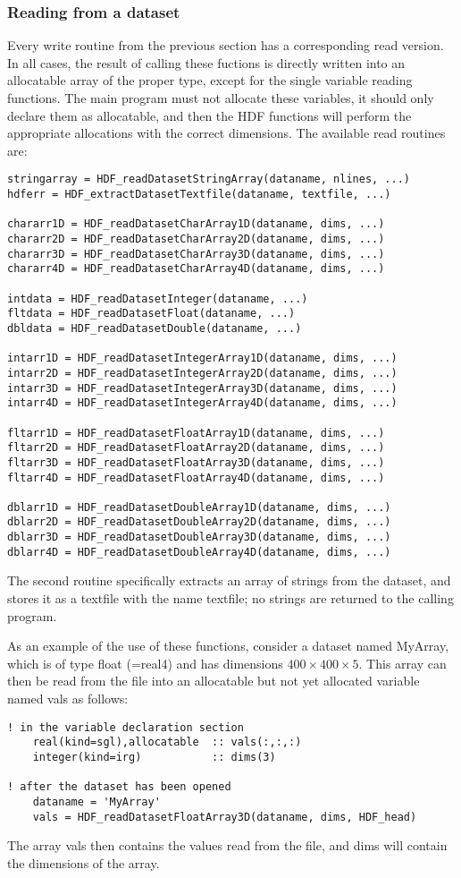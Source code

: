 \documentclass[DIV=calc, paper=letter, fontsize=11pt]{scrartcl}	 %
\begin{document}
\subsubsection{Reading from a dataset}
Every write routine from the previous section has a corresponding read version.  In 
all cases, the result of calling these fuctions is directly written into an allocatable 
array of the proper type, except for the single variable reading functions.  
The main program must not allocate these variables, it should
only declare them as allocatable, and then the HDF functions will perform the appropriate
allocations with the correct dimensions. The available read routines are:
\begin{verbatim}
stringarray = HDF_readDatasetStringArray(dataname, nlines, ...)
hdferr = HDF_extractDatasetTextfile(dataname, textfile, ...) 

chararr1D = HDF_readDatasetCharArray1D(dataname, dims, ...) 
chararr2D = HDF_readDatasetCharArray2D(dataname, dims, ...) 
chararr3D = HDF_readDatasetCharArray3D(dataname, dims, ...) 
chararr4D = HDF_readDatasetCharArray4D(dataname, dims, ...) 

intdata = HDF_readDatasetInteger(dataname, ...)
fltdata = HDF_readDatasetFloat(dataname, ...)
dbldata = HDF_readDatasetDouble(dataname, ...) 

intarr1D = HDF_readDatasetIntegerArray1D(dataname, dims, ...) 
intarr2D = HDF_readDatasetIntegerArray2D(dataname, dims, ...) 
intarr3D = HDF_readDatasetIntegerArray3D(dataname, dims, ...) 
intarr4D = HDF_readDatasetIntegerArray4D(dataname, dims, ...) 

fltarr1D = HDF_readDatasetFloatArray1D(dataname, dims, ...) 
fltarr2D = HDF_readDatasetFloatArray2D(dataname, dims, ...) 
fltarr3D = HDF_readDatasetFloatArray3D(dataname, dims, ...) 
fltarr4D = HDF_readDatasetFloatArray4D(dataname, dims, ...) 

dblarr1D = HDF_readDatasetDoubleArray1D(dataname, dims, ...)
dblarr2D = HDF_readDatasetDoubleArray2D(dataname, dims, ...)
dblarr3D = HDF_readDatasetDoubleArray3D(dataname, dims, ...)
dblarr4D = HDF_readDatasetDoubleArray4D(dataname, dims, ...)
\end{verbatim}
The second routine specifically extracts an array of strings from the dataset, and
stores it as a textfile with the name \textsf{textfile}; no strings are returned to the 
calling program.

As an example of the use of these functions, consider a dataset named \textsf{MyArray}, which 
is of type \textsf{float} (=real4) and has dimensions $400\times 400 \times 5$.  This array can
then be read from the file into an allocatable but not yet allocated variable named \textsf{vals}
as follows:
\begin{verbatim}
! in the variable declaration section
	real(kind=sgl),allocatable	:: vals(:,:,:)
	integer(kind=irg)			:: dims(3)
	
! after the dataset has been opened
	dataname = 'MyArray'
	vals = HDF_readDatasetFloatArray3D(dataname, dims, HDF_head)
\end{verbatim}
The array \textsf{vals} then contains the values read from the file, and \textsf{dims} will
contain the dimensions of the array.
\end{document}
